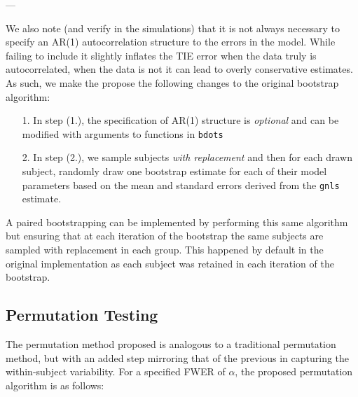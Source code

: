 \documentclass{article}
\newcommand{\xt}{\texttt}
\begin{document}
---


We also note (and verify in the simulations) that it is not always necessary to specify an AR(1) autocorrelation structure to the errors in the model. While failing to include it slightly inflates the TIE error when the data truly is autocorrelated, when the data is not it can lead to overly conservative estimates. As such, we make the propose the following changes to the original bootstrap algorithm:

\begin{singlespace}
\begin{enumerate}
\vspace{-2mm}
\item[1.] In step (1.), the specification of AR(1) structure is \textit{optional} and can be modified with arguments to functions in \xt{bdots}
\item[2.] In step (2.), we sample subjects \textit{with replacement} and then for each drawn subject, randomly draw one bootstrap estimate for each of their model parameters based on the mean and standard errors derived from the \xt{gnls} estimate.
\end{enumerate}
\end{singlespace}

A paired bootstrapping can be implemented by performing this same algorithm but ensuring that at each iteration of the bootstrap the same subjects are sampled with replacement in each group. This happened by default in the original implementation as each subject was retained in each iteration of the bootstrap.

\subsection{Permutation Testing}

The permutation method proposed is analogous to a traditional permutation method, but with an added step mirroring that of the previous in capturing the within-subject variability. For a specified FWER of $\alpha$, the proposed permutation algorithm is as follows:
\end{document}
